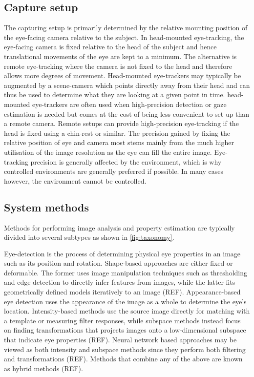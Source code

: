 \subsection{Capture setup}
The capturing setup is primarily determined by the relative mounting position of the eye-facing camera relative to the subject. In \gls{head-mounted} \gls{eye-tracking},  the eye-facing camera is fixed relative to the head of the subject and hence translational movements of the eye are kept to a minimum. The alternative is remote \gls{eye-tracking} where the camera is not fixed to the head and therefore allows more degrees of movement. Head-mounted eye-trackers may typically be augmented by a \gls{scene-camera} which points directly away from their head and can thus be used to determine what they are looking at a given point in time. \Gls{head-mounted} \gls{eye-tracker}s are often used when high-precision detection or gaze estimation is needed but comes at the cost of being less convenient to set up than a remote camera. Remote setups can provide high-precision eye-tracking if the head is fixed using a chin-rest or similar. The precision gained by fixing the relative position of eye and camera most stems mainly from the much higher utilisation of the image resolution as the eye can fill the entire image. Eye-tracking precision is generally affected by the environment, which is why controlled environments are generally preferred if possible. In many cases however, the environment cannot be controlled.

\subsection{System methods}
Methods for performing image analysis and property estimation are typically divided into several subtypes as shown in \cref{fig:taxonomy}. 

Eye-detection is the process of determining physical eye properties in an image such as its position and rotation. Shape-based approaches are either fixed or deformable. The former uses image manipulation techniques such as thresholding and edge detection to directly infer features from images, while the latter fits geometrically defined models iteratively to an image (REF). Appearance-based eye detection uses the appearance of the image as a whole to determine the eye's location. Intensity-based methods use the source image directly for matching with a template or measuring filter responses, while subspace methods instead focus on finding transformations that projects images onto a low-dimensional subspace that indicate eye properties (REF). Neural network based approaches may be viewed as both intensity and subspace methods since they perform both filtering and transformations (REF). Methods that combine any of the above are known as hybrid methods (REF). 

